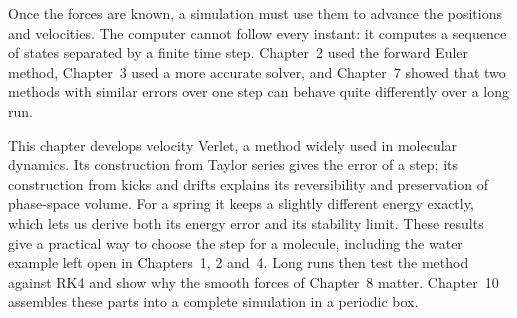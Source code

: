 Once the forces are known, a simulation must use them to advance the
positions and velocities. The computer cannot follow every instant: it
computes a sequence of states separated by a finite time step. Chapter~2
used the forward Euler method, Chapter~3 used a more accurate solver, and
Chapter~7 showed that two methods with similar errors over one step can
behave quite differently over a long run.

This chapter develops velocity Verlet, a method widely used in molecular
dynamics. Its construction from Taylor series gives the error of a step;
its construction from kicks and drifts explains its reversibility and
preservation of phase-space volume. For a spring it keeps a slightly
different energy exactly, which lets us derive both its energy error and
its stability limit. These results give a practical way to choose the
step for a molecule, including the water example left open in
Chapters~1, 2 and~4. Long runs then test the method against RK4 and show
why the smooth forces of Chapter~8 matter. Chapter~10 assembles these
parts into a complete simulation in a periodic box.

